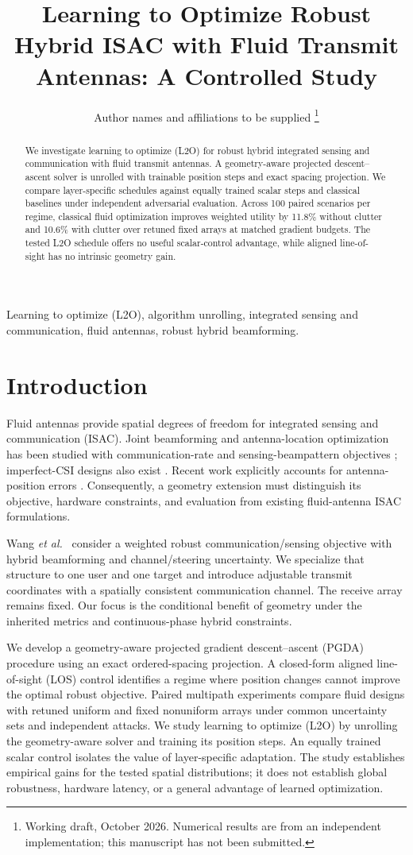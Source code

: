 \documentclass[10pt,journal,onecolumn,draftclsnofoot]{IEEEtran}
\title{Learning to Optimize Robust Hybrid ISAC with Fluid Transmit Antennas: A Controlled Study}
\author{Author names and affiliations to be supplied%
\thanks{Working draft, October 2026. Numerical results are from an independent implementation; this manuscript has not been submitted.}}
\begin{document}
\maketitle
\begin{abstract}
We investigate learning to optimize (L2O) for robust hybrid integrated sensing and communication with fluid transmit antennas. A geometry-aware projected descent--ascent solver is unrolled with trainable position steps and exact spacing projection. We compare layer-specific schedules against equally trained scalar steps and classical baselines under independent adversarial evaluation. Across 100 paired scenarios per regime, classical fluid optimization improves weighted utility by 11.8\% without clutter and 10.6\% with clutter over retuned fixed arrays at matched gradient budgets. The tested L2O schedule offers no useful scalar-control advantage, while aligned line-of-sight has no intrinsic geometry gain.
\end{abstract}
\begin{IEEEkeywords}
Learning to optimize (L2O), algorithm unrolling, integrated sensing and communication, fluid antennas, robust hybrid beamforming.
\end{IEEEkeywords}

\section{Introduction}
Fluid antennas provide spatial degrees of freedom for integrated sensing and communication (ISAC). Joint beamforming and antenna-location optimization has been studied with communication-rate and sensing-beampattern objectives \cite{zhou2024}; imperfect-CSI designs also exist \cite{hao2024}. Recent work explicitly accounts for antenna-position errors \cite{zhang2026}. Consequently, a geometry extension must distinguish its objective, hardware constraints, and evaluation from existing fluid-antenna ISAC formulations.

Wang \emph{et al.}~\cite{wang2026} consider a weighted robust communication/sensing objective with hybrid beamforming and channel/steering uncertainty. We specialize that structure to one user and one target and introduce adjustable transmit coordinates with a spatially consistent communication channel. The receive array remains fixed. Our focus is the conditional benefit of geometry under the inherited metrics and continuous-phase hybrid constraints.

We develop a geometry-aware projected gradient descent--ascent (PGDA) procedure using an exact ordered-spacing projection. A closed-form aligned line-of-sight (LOS) control identifies a regime where position changes cannot improve the optimal robust objective. Paired multipath experiments compare fluid designs with retuned uniform and fixed nonuniform arrays under common uncertainty sets and independent attacks. We study learning to optimize (L2O) by unrolling the geometry-aware solver and training its position steps. An equally trained scalar control isolates the value of layer-specific adaptation. The study establishes empirical gains for the tested spatial distributions; it does not establish global robustness, hardware latency, or a general advantage of learned optimization.
\end{document}
